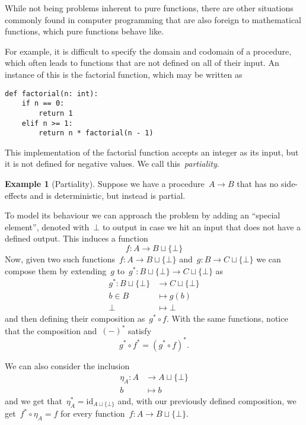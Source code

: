 \documentclass[a4paper]{article}
\theoremstyle{plain}
\theoremstyle{definition}
\newtheorem{example}[theorem]{Example}
\newcommand{\id}{\mathrm{id}}
\begin{document}
While not being problems inherent to pure functions, there are other situations
commonly found in computer programming that are also foreign to mathematical
functions, which pure functions behave like.

For example, it is difficult to specify the domain and codomain of a procedure,
which often leads to functions that are not defined on all of their input. An
instance of this is the factorial function, which may be written as
\begin{verbatim}
def factorial(n: int):
    if n == 0:
        return 1
    elif n >= 1:
        return n * factorial(n - 1)
\end{verbatim}
This implementation of the factorial function accepts an integer as its input,
but it is not defined for negative values. We call this~\emph{partiality}.

\begin{example}[Partiality]
    \label{ex:kleisli-partiality}
    Suppose we have a procedure~\(A\longrightarrow B\) that has no side-effects
    and is deterministic, but instead is partial.

    To model its behaviour we can approach the problem by adding an ``special
    element'', denoted with~\(\bot\) to output in case we hit an input that does
    not have a defined output. This induces a function
    \[
        f:A\longrightarrow B\sqcup\{\bot\}
    \]
    Now, given two such functions~\(f:A\longrightarrow B\sqcup\{\bot\}\)
    and~\(g:B\longrightarrow C\sqcup\{\bot\}\) we can compose them by
    extending~\(g\) to~\(g^{\ast}:B\sqcup\{\bot\}\longrightarrow C\sqcup\{\bot\}\) as
    \begin{align*}
        g^{\ast}:B\sqcup\{\bot\}&\longrightarrow C\sqcup\{\bot\} \\
        b\in B&\longmapsto g(b) \\
        \bot&\longmapsto\bot
    \end{align*}
    and then defining their composition as~\(g^{\ast}\circ f\). With the same
    functions, notice that the composition and~\((-)^{\ast}\) satisfy
    \[
        g^{\ast}\circ f^{\ast} = (g^{\ast}\circ f)^{\ast}.
    \]

    We can also consider the inclusion
    \begin{align*}
        \eta_{A}:A&\longrightarrow A\sqcup\{\bot\} \\
        b&\longmapsto b
    \end{align*}
    and we get that~\(\eta_{A}^{\ast}=\id_{A\sqcup\{\bot\}}\) and, with our previously
    defined composition, we get~\(f^{\ast}\circ\eta_{A}=f\) for every
    function~\(f:A\longrightarrow B\sqcup\{\bot\}\).
\end{example}
\end{document}
